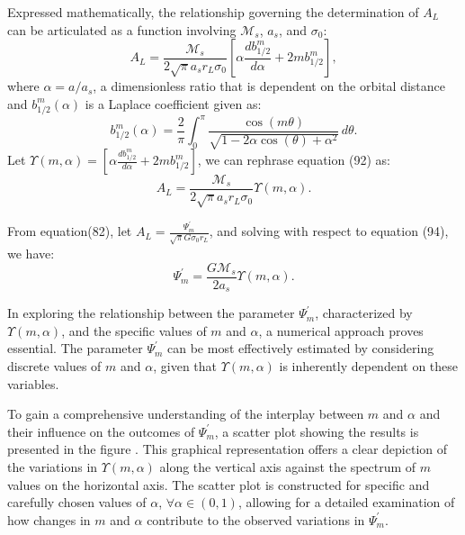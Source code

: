 \documentclass{article}
\begin{document}
Expressed mathematically, the relationship governing the determination of $A_{L}$ can be articulated as a function involving $\mathcal{M}_{s}$, $a_{s}$, and $\sigma_{0}$: 
\begin{equation}
    A_{L} = \frac{\mathcal{M}_{s}}{2\sqrt{\pi}a_{s}r_{L}\sigma_{0}}\left[\alpha \frac{d b_{1/2}^{m}}{d \alpha} + 2mb_{1/2}^{m}\right],
\end{equation}
where $\alpha = a/a_{s}$, a dimensionless ratio that is dependent on the orbital distance and $b_{1/2}^{m}(\alpha)$ is a Laplace coefficient given as\cite{1961mcm..book.....B}\cite{murray_dermott_2000}\cite{1984prin.conf..513S}\cite{articleTisHar}:
\begin{equation}
    b_{1/2}^{m}(\alpha) = \frac{2}{\pi} \int_{0}^{\pi} \frac{\cos(m \theta)}{\sqrt{1 - 2 \alpha \cos(\theta) + \alpha^2}} \, d\theta.
\end{equation}
Let $\Upsilon (m, \alpha) = \left[\alpha \frac{d b_{1/2}^{m}}{d \alpha} + 2mb_{1/2}^{m}\right]$, we can rephrase equation (92) as:
\begin{equation}
    A_{L} = \frac{\mathcal{M}_{s}}{2\sqrt{\pi}a_{s}r_{L}\sigma_{0}}\Upsilon (m,\alpha).
\end{equation}

From equation(82), let $A_{L} = \frac{\Psi_{m}^{'}}{\sqrt{\pi}G\sigma_{0} r_{L}}$, and solving with respect to equation (94), we have:
\begin{equation}
  \Psi_{m}^{'} =  \frac{G \mathcal{M}_{s}}{2a_{s}}\Upsilon(m,\alpha).
\end{equation}
   
In exploring the relationship between the parameter $\Psi_{m}^{'}$, characterized by $\Upsilon(m,\alpha)$, and the specific values of $m$ and $\alpha$, a numerical approach proves essential. The parameter $\Psi_{m}^{'}$ can be most effectively estimated by considering discrete values of $m$ and $\alpha$, given that $\Upsilon(m,\alpha)$ is inherently dependent on these variables.

To gain a comprehensive understanding of the interplay between $m$ and $\alpha$ and their influence on the outcomes of $\Psi_{m}^{'}$, a scatter plot showing the results is presented in the figure . This graphical representation offers a clear depiction of the variations in $\Upsilon(m,\alpha)$ along the vertical axis against the spectrum of $m$ values on the horizontal axis. The scatter plot is constructed for specific and carefully chosen values of $\alpha$, $\forall \alpha \in (0,1)$, allowing for a detailed examination of how changes in $m$ and $\alpha$ contribute to the observed variations in $\Psi_{m}^{'}$. 
\end{document}
